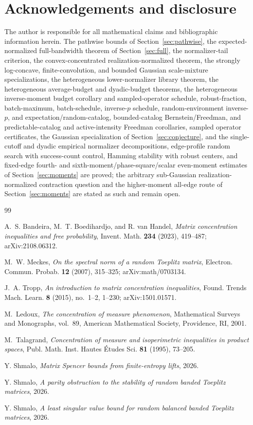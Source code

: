 \documentclass[11pt]{amsart}
\numberwithin{equation}{section}
\theoremstyle{definition}
\theoremstyle{remark}
\begin{document}
\section*{Acknowledgements and disclosure}
The author is responsible for all mathematical claims and bibliographic
information herein. The pathwise bounds of Section~\ref{sec:pathwise}, the
expected-normalized full-bandwidth theorem of Section~\ref{sec:full}, the
normalizer-tail criterion, the convex-concentrated realization-normalized
theorem, the strongly log-concave, finite-convolution, and bounded Gaussian
scale-mixture specializations, the
heterogeneous lower-normalizer library theorem, the heterogeneous average-budget
and dyadic-budget theorems, the heterogeneous inverse-moment budget corollary
and sampled-operator schedule, robust-fraction, batch-maximum, batch-schedule,
inverse-\(p\) schedule, random-environment inverse-\(p\), and
expectation/random-catalog, bounded-catalog Bernstein/Freedman, and
predictable-catalog and active-intensity Freedman corollaries,
sampled operator certificates, the Gaussian specialization of
Section~\ref{sec:conjecture}, and the
single-cutoff and dyadic empirical normalizer decompositions, edge-profile
random search with success-count control, Hamming stability with robust centers,
and fixed-edge
fourth- and sixth-moment/phase-square/scalar even-moment estimates of
Section~\ref{sec:moments} are proved; the arbitrary sub-Gaussian
realization-normalized contraction question and the higher-moment all-edge route
of Section~\ref{sec:moments} are stated as such and remain open.

\begin{thebibliography}{99}

A.~S. Bandeira, M.~T. Boedihardjo, and R. van Handel,
\emph{Matrix concentration inequalities and free probability},
Invent. Math. \textbf{234} (2023), 419--487; arXiv:2108.06312.

M.~W. Meckes,
\emph{On the spectral norm of a random Toeplitz matrix},
Electron. Commun. Probab. \textbf{12} (2007), 315--325; arXiv:math/0703134.

J.~A. Tropp,
\emph{An introduction to matrix concentration inequalities},
Found. Trends Mach. Learn. \textbf{8} (2015), no.~1--2, 1--230; arXiv:1501.01571.

M.~Ledoux,
\emph{The concentration of measure phenomenon},
Mathematical Surveys and Monographs, vol.~89, American Mathematical Society,
Providence, RI, 2001.

M.~Talagrand,
\emph{Concentration of measure and isoperimetric inequalities in product spaces},
Publ. Math. Inst. Hautes \'Etudes Sci. \textbf{81} (1995), 73--205.

Y. Shmalo,
\emph{Matrix Spencer bounds from finite-entropy lifts},
2026.

Y. Shmalo,
\emph{A parity obstruction to the stability of random banded Toeplitz matrices},
2026.

Y. Shmalo,
\emph{A least singular value bound for random balanced banded Toeplitz matrices},
2026.

\end{thebibliography}
\end{document}
